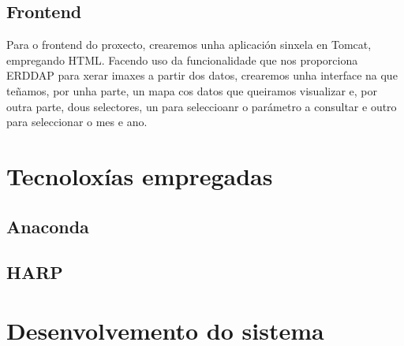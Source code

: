 \subsection{Frontend}\label{frontend}
Para o frontend do proxecto, crearemos unha aplicación sinxela en Tomcat, empregando HTML. Facendo uso da funcionalidade que nos proporciona ERDDAP para xerar imaxes a partir dos datos, crearemos
unha interface na que teñamos, por unha parte, un mapa cos datos que queiramos visualizar e, por outra parte, dous selectores, un para seleccioanr o parámetro a consultar e outro para seleccionar
o mes e ano.

\section{Tecnoloxías empregadas}\label{tecnoloxias}
\subsection{Anaconda}\label{anaconda}

\subsection{HARP}\label{harp}

\section{Desenvolvemento do sistema}\label{desenvolvemento}
